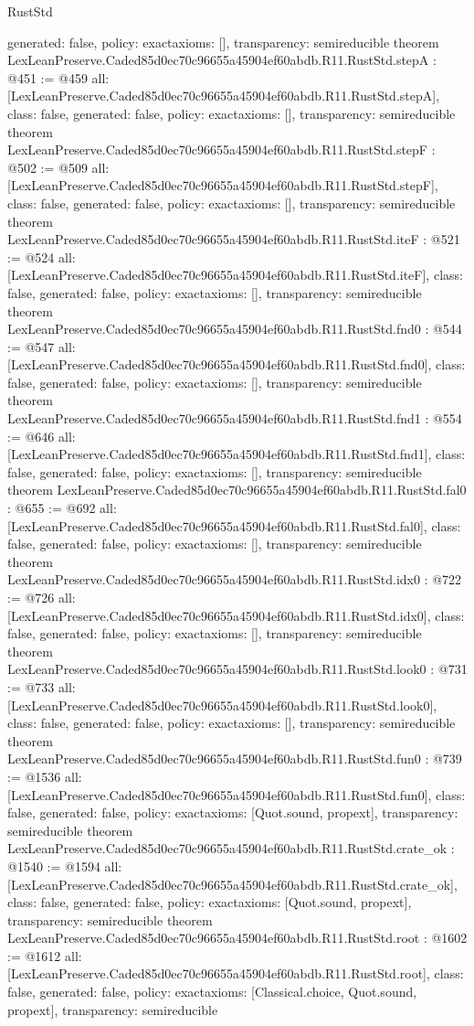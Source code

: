 \begin{lexlean}{RustStd}
\begin{coremodule}
{  generated: false,
  policy: exact{axioms: []},
  transparency: semireducible
}
theorem LexLeanPreserve.Caded85d0ec70c96655a45904ef60abdb.R11.RustStd.stepA : @451 := @459 {
  all: [LexLeanPreserve.Caded85d0ec70c96655a45904ef60abdb.R11.RustStd.stepA],
  class: false,
  generated: false,
  policy: exact{axioms: []},
  transparency: semireducible
}
theorem LexLeanPreserve.Caded85d0ec70c96655a45904ef60abdb.R11.RustStd.stepF : @502 := @509 {
  all: [LexLeanPreserve.Caded85d0ec70c96655a45904ef60abdb.R11.RustStd.stepF],
  class: false,
  generated: false,
  policy: exact{axioms: []},
  transparency: semireducible
}
theorem LexLeanPreserve.Caded85d0ec70c96655a45904ef60abdb.R11.RustStd.iteF : @521 := @524 {
  all: [LexLeanPreserve.Caded85d0ec70c96655a45904ef60abdb.R11.RustStd.iteF],
  class: false,
  generated: false,
  policy: exact{axioms: []},
  transparency: semireducible
}
theorem LexLeanPreserve.Caded85d0ec70c96655a45904ef60abdb.R11.RustStd.fnd0 : @544 := @547 {
  all: [LexLeanPreserve.Caded85d0ec70c96655a45904ef60abdb.R11.RustStd.fnd0],
  class: false,
  generated: false,
  policy: exact{axioms: []},
  transparency: semireducible
}
theorem LexLeanPreserve.Caded85d0ec70c96655a45904ef60abdb.R11.RustStd.fnd1 : @554 := @646 {
  all: [LexLeanPreserve.Caded85d0ec70c96655a45904ef60abdb.R11.RustStd.fnd1],
  class: false,
  generated: false,
  policy: exact{axioms: []},
  transparency: semireducible
}
theorem LexLeanPreserve.Caded85d0ec70c96655a45904ef60abdb.R11.RustStd.fal0 : @655 := @692 {
  all: [LexLeanPreserve.Caded85d0ec70c96655a45904ef60abdb.R11.RustStd.fal0],
  class: false,
  generated: false,
  policy: exact{axioms: []},
  transparency: semireducible
}
theorem LexLeanPreserve.Caded85d0ec70c96655a45904ef60abdb.R11.RustStd.idx0 : @722 := @726 {
  all: [LexLeanPreserve.Caded85d0ec70c96655a45904ef60abdb.R11.RustStd.idx0],
  class: false,
  generated: false,
  policy: exact{axioms: []},
  transparency: semireducible
}
theorem LexLeanPreserve.Caded85d0ec70c96655a45904ef60abdb.R11.RustStd.look0 : @731 := @733 {
  all: [LexLeanPreserve.Caded85d0ec70c96655a45904ef60abdb.R11.RustStd.look0],
  class: false,
  generated: false,
  policy: exact{axioms: []},
  transparency: semireducible
}
theorem LexLeanPreserve.Caded85d0ec70c96655a45904ef60abdb.R11.RustStd.fun0 : @739 := @1536 {
  all: [LexLeanPreserve.Caded85d0ec70c96655a45904ef60abdb.R11.RustStd.fun0],
  class: false,
  generated: false,
  policy: exact{axioms: [Quot.sound, propext]},
  transparency: semireducible
}
theorem LexLeanPreserve.Caded85d0ec70c96655a45904ef60abdb.R11.RustStd.crate_ok : @1540 := @1594 {
  all: [LexLeanPreserve.Caded85d0ec70c96655a45904ef60abdb.R11.RustStd.crate_ok],
  class: false,
  generated: false,
  policy: exact{axioms: [Quot.sound, propext]},
  transparency: semireducible
}
theorem LexLeanPreserve.Caded85d0ec70c96655a45904ef60abdb.R11.RustStd.root : @1602 := @1612 {
  all: [LexLeanPreserve.Caded85d0ec70c96655a45904ef60abdb.R11.RustStd.root],
  class: false,
  generated: false,
  policy: exact{axioms: [Classical.choice, Quot.sound, propext]},
  transparency: semireducible
}


\end{coremodule}
\end{lexlean}
